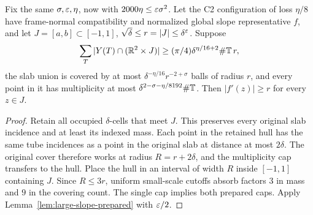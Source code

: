 \begin{lemma}
\label{lem:large-slope-prescribed}
\leanok
{}
Fix the same $\sigma,\varepsilon,\eta$, now with
$2000\eta\leq\varepsilon\sigma^2$. Let the C2 configuration of loss $\eta/8$
have frame-normal compatibility and normalized global slope representative
$f$, and let $J=[a,b]\subset[-1,1]$,
$\sqrt\delta\leq r=|J|\leq\delta^\varepsilon$. Suppose
\[
 \sum_T |Y(T)\cap(\mathbb{R}^2\times J)|
       \geq (\pi/4)\delta^{\eta/16+2}\#\mathbb{T}\,r,
\]
the slab union is covered by at most
$\delta^{-\eta/16}r^{-2+\sigma}$ balls of radius $r$, and every point
in it has multiplicity at most $\delta^{2-\sigma-\eta/8192}\#\mathbb{T}$.
Then $|f'(z)|\geq r$ for every $z\in J$.
\end{lemma}
\begin{proof}
\leanok
Retain all occupied $\delta$-cells that meet $J$. This preserves every
original slab incidence and at least its indexed mass. Each point in
the retained hull has the same tube incidences as a point in the original
slab at distance at most $2\delta$. The original cover therefore works
at radius $R=r+2\delta$, and the multiplicity cap transfers to the hull.
Place the hull in an interval of width $R$ inside $[-1,1]$ containing $J$.
Since $R\leq3r$, uniform small-scale cutoffs absorb factors $3$ in mass
and $9$ in the covering count. The single cap implies both prepared caps.
Apply Lemma~\ref{lem:large-slope-prepared} with $\varepsilon/2$.
\end{proof}

